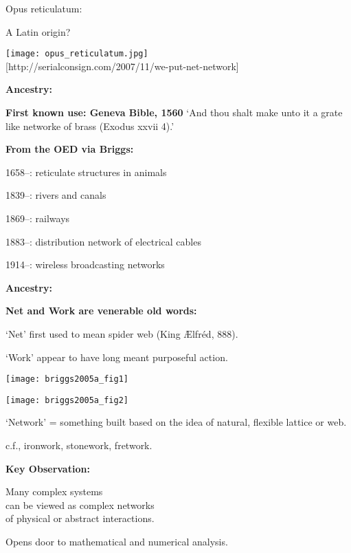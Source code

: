       Opus reticulatum:
     
      A Latin origin?
    
    
    \texttt{[image: opus\_reticulatum.jpg]}\\
    {\tiny [http://serialconsign.com/2007/11/we-put-net-network]}
  

  \textbf{Ancestry:}

  \textbf{First known use: Geneva Bible, 1560}
    `And thou shalt make unto it a grate like networke of brass (Exodus xxvii 4).'
  

  \textbf{From the OED via Briggs:}
    
     
      1658--: reticulate structures in animals
     
      1839--: rivers and canals
     
      1869--: railways
     
      1883--: distribution network of electrical cables
     
      1914--: wireless broadcasting networks
    
  



  \textbf{Ancestry:}

  \textbf{Net and Work are venerable old words:}
    
    
      \alert{`Net'} first used to mean spider web 
      {\small (King {\AE}lfr\'{e}d, 888)}.
    
      \alert{`Work'} appear to have long meant purposeful action.
    
  

      
    \texttt{[image: briggs2005a\_fig1]}
    
    \texttt{[image: briggs2005a\_fig2]}
  
  
  
    `Network' = something built
    based on the idea of natural, flexible lattice or web.
   
    c.f., ironwork, stonework, fretwork.
  


  \textbf{Key Observation:}

  
   
    Many \alert{complex systems}\\ 
    can be viewed as \alert{complex networks}\\
    of physical or abstract interactions.
   
    Opens door to mathematical and numerical analysis.
    
